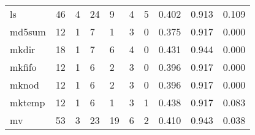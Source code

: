\begin{longtable}{lp{2.0cm}p{2.0cm}p{2.0cm}p{2.0cm}p{2.0cm}p{2.0cm}p{2.0cm}p{2.0cm}p{2.0cm}}
ls        &                     46 &                                             4 &                                           24 &                                           9 &                                            4 &                                          5 &                                0.402 &                                  0.913 &                                0.109 \\
md5sum    &                     12 &                                             1 &                                            7 &                                           1 &                                            3 &                                          0 &                                0.375 &                                  0.917 &                                0.000 \\
mkdir     &                     18 &                                             1 &                                            7 &                                           6 &                                            4 &                                          0 &                                0.431 &                                  0.944 &                                0.000 \\
mkfifo    &                     12 &                                             1 &                                            6 &                                           2 &                                            3 &                                          0 &                                0.396 &                                  0.917 &                                0.000 \\
mknod     &                     12 &                                             1 &                                            6 &                                           2 &                                            3 &                                          0 &                                0.396 &                                  0.917 &                                0.000 \\
mktemp    &                     12 &                                             1 &                                            6 &                                           1 &                                            3 &                                          1 &                                0.438 &                                  0.917 &                                0.083 \\
mv        &                     53 &                                             3 &                                           23 &                                          19 &                                            6 &                                          2 &                                0.410 &                                  0.943 &                                0.038 \\

\end{longtable}
